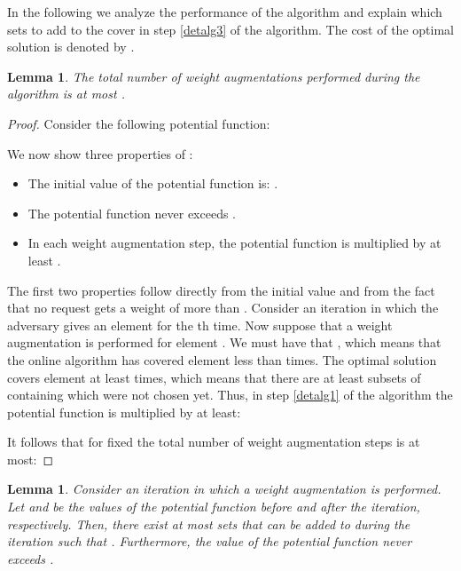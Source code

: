 \documentclass{sig-alternate}
\newtheorem{lemma}[theorem]{Lemma}
\begin{document}
In the following we analyze the performance of the algorithm and
explain which sets to add to the cover  in step \ref{detalg3}
of the algorithm. The cost of the optimal solution  is
denoted by .

\begin{lemma}\label{det_steps}
The total number of weight augmentations performed during the
algorithm is at most .
\end{lemma}

\begin{proof}
Consider the following potential function:

We now show three properties of :
\begin{itemize}
    \item The initial value of the potential function is:
    .
    \item The potential function never exceeds .
    \item In each weight augmentation step, the potential function
    is multiplied by at least .
\end{itemize}
The first two properties follow directly from the initial value
and from the fact that no request gets a weight of more than
. Consider an iteration in which the adversary gives an
element  for the th time. Now suppose that a weight
augmentation is performed for element . We must have that
, which means that the online algorithm
has covered element  less than  times. The
optimal solution  covers element  at least  times,
which means that there are at least  subsets of 
containing  which were not chosen yet. Thus, in step
\ref{detalg1} of the algorithm the potential function is
multiplied by at least:

It follows that for fixed  the total number of weight
augmentation steps is at most:


\end{proof}

\begin{lemma}\label{det_poten}
Consider an iteration in which a weight augmentation is performed.
Let  and  be the values of the potential function
 before and after the iteration, respectively. Then, there
exist at most  sets that can be added to  during
the iteration such that . Furthermore, the
value of the potential function never exceeds .
\end{lemma}
\end{document}
